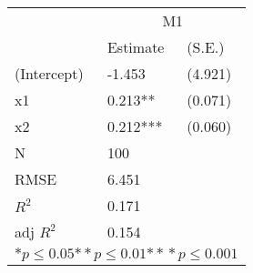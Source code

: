 \begin{tabular}{*{3}{l}}
\hline
                  & \multicolumn{2}{c}{M1}   \tabularnewline
                   &Estimate  &(S.E.)  \tabularnewline
 \hline
 \hline
   (Intercept)     &-1.453   &   (4.921) \tabularnewline
   x1              &0.213**   &   (0.071) \tabularnewline
   x2              &0.212***   &   (0.060) \tabularnewline
 \hline
 N                 &100       &        \tabularnewline
 RMSE             &6.451         & \tabularnewline
 $R^2$             &0.171         & \tabularnewline
 adj $R^2$         &0.154         & \tabularnewline
 \hline
\hline
 
 \multicolumn{3}{c}{${*  p}\le 0.05$${*\!\!*  p}\le 0.01$${*\!\!*\!\!*  p}\le 0.001$}\tabularnewline
 \end{tabular}